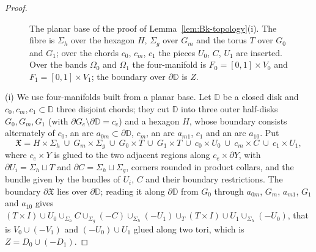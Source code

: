\documentclass[11pt]{amsart}
\theoremstyle{definition}
\theoremstyle{remark}
\theoremstyle{plain}
\numberwithin{equation}{section}
\begin{document}
\begin{proof}
\begin{figure}[ht]
\centering
{}
\caption{The planar base of the proof of Lemma~\ref{lem:Bk-topology}(i). The fibre is
$\Sigma_h$ over the hexagon $H$, $\Sigma_g$ over $G_m$ and the torus $T$ over $G_0$ and $G_1$;
over the chords $c_0$, $c_m$, $c_1$ the pieces $U_0$, $C$, $U_1$ are inserted. Over the
bands $\Omega_0$ and $\Omega_1$ the four-manifold is $F_0=[0,1]\times V_0$ and
$F_1=[0,1]\times V_1$; the boundary over $\partial\mathbb D$ is $Z$.}
\label{fig:planar-base}
\end{figure}

(i) We use four-manifolds built from a planar base. Let $\mathbb D$ be a closed disk
and $c_0,c_m,c_1\subset\mathbb D$ three disjoint chords; they cut $\mathbb D$ into three outer
half-disks $G_0,G_m,G_1$ (with $\partial G_e\setminus\partial\mathbb D=c_e$) and a hexagon $H$, whose boundary
consists alternately of $c_0$, an arc $a_{0m}\subset\partial\mathbb D$, $c_m$, an arc $a_{m1}$, $c_1$ and an
arc $a_{10}$. Put
\[
\mathfrak X=H\times\Sigma_h\ \cup\ G_m\times\Sigma_g\ \cup\ G_0\times T\ \cup\ G_1\times T\ \cup\
c_0\times U_0\ \cup\ c_m\times C\ \cup\ c_1\times U_1 ,
\]
where $c_e\times Y$ is glued to the two adjacent regions along $c_e\times\partial Y$, with
$\partial U_i=\Sigma_h\sqcup T$ and $\partial C=\Sigma_h\sqcup\Sigma_g$, corners rounded in product collars, and
the bundle given by the bundles of $U_i$, $C$ and their boundary restrictions. The
boundary $\partial\mathfrak X$ lies over $\partial\mathbb D$; reading it along $\partial\mathbb D$ from $G_0$ through $a_{0m}$,
$G_m$, $a_{m1}$, $G_1$ and $a_{10}$ gives
$(T\times I)\cup U_0\cup_{\Sigma_h}C\cup_{\Sigma_g}(-C)\cup_{\Sigma_h}(-U_1)\cup_T(T\times I)\cup U_1\cup_{\Sigma_h}(-U_0)$, that is
$V_0\cup(-V_1)$ and $(-U_0)\cup U_1$ glued along two tori, which is
$Z=D_0\cup(-D_1)$.


\end{proof}
\end{document}
